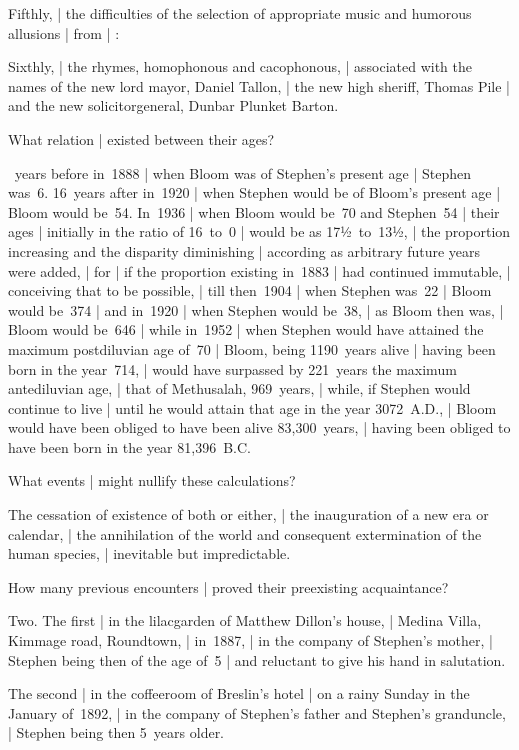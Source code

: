 \Religious
Fifthly, |
the difficulties of the selection of appropriate music and humorous allusions |
from  |
:

\Places
Sixthly, |
the rhymes, homophonous and cacophonous, |
associated with the names of the new lord mayor, Daniel Tallon, |
the new high sheriff, Thomas Pile |
and the new solicitorgeneral, Dunbar Plunket Barton.


What relation |
existed between their ages?

~years before in~1888 |
when Bloom was of Stephen's present age |
Stephen was~6.
16~years after in~1920 |
when Stephen would be of Bloom's present age |
Bloom would be~54.
In~1936 |
when Bloom would be~70 and Stephen~54 |
their ages |
initially in the ratio of 16~to~0 |
would be as 17½~to~13½, |
the proportion increasing and the disparity diminishing |
according as arbitrary future years were added, |
for |
if the proportion existing in~1883 |
had continued immutable, |
conceiving that to be possible, |
till then~1904 |
when Stephen was~22 |
Bloom would be~374 |
and in~1920 |
when Stephen would be~38, |
as Bloom then was, |
Bloom would be~646 |
while in~1952 |
when Stephen would have attained the maximum postdiluvian age of~70 |
Bloom, being 1190~years alive |
having been born in the year~714, |
would have surpassed by 221~years the maximum antediluvian age, |
that of Methusalah, 969~years, |
while, if Stephen would continue to live |
until he would attain that age in the year 3072~A.D., |
Bloom would have been obliged to have been alive 83,300~years, |
having been obliged to have been born in the year 81,396~B.C.


What events |
might nullify these calculations?

\Philosophy
The cessation of existence of both or either, |
the inauguration of a new era or calendar, |
the annihilation of the world and consequent extermination of the human species, |
inevitable but impredictable.


How many previous encounters |
proved their preexisting acquaintance?

\Memories
Two.
The first |
in the lilacgarden of Matthew Dillon's house, |
Medina Villa, Kimmage road, Roundtown, |
in~1887, |
in the company of Stephen's mother, |
Stephen being then of the age of~5 |
and reluctant to give his hand in salutation.

\Places
The second |
in the coffeeroom of Breslin's hotel |
on a rainy Sunday in the January of~1892, |
in the company of Stephen's father and Stephen's granduncle, |
Stephen being then 5~years older.



